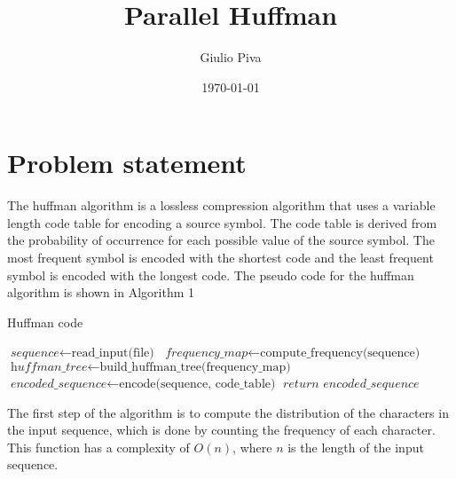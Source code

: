 \documentclass{report}
\title{Parallel Huffman}
\author{Giulio Piva}
\date{\today}
\begin{document}
\maketitle

\tableofcontents

\chapter{Problem statement}
The huffman algorithm is a lossless compression algorithm that uses a variable length code table
for encoding a source symbol. The code table is derived from the probability of occurrence for each
possible value of the source symbol. The most frequent symbol is encoded with the shortest code
and the least frequent symbol is encoded with the longest code.
The pseudo code for the huffman algorithm is shown in Algorithm 1

\begin{algorithm}
\caption{Huffman code}
\begin{algorithmic}[1]
\State $\textit{sequence} \gets \text{read\_input(file)}$
\State $\textit{frequency\_map} \gets \text{compute\_frequency(sequence)}$
\State $\textit{huffman\_tree} \gets \text{build\_huffman\_tree(frequency\_map)}$
\State $\textit{encoded\_sequence} \gets \text{encode(sequence, code\_table)}$
\State $ \textit{return encoded\_sequence}$
\EndProcedure
\end{algorithmic}
\end{algorithm}

The first step of the algorithm is to compute the distribution of the characters in the input sequence,
which is done by counting the frequency of each character. This function has a complexity of $O(n)$,
where $n$ is the length of the input sequence.
\end{document}
